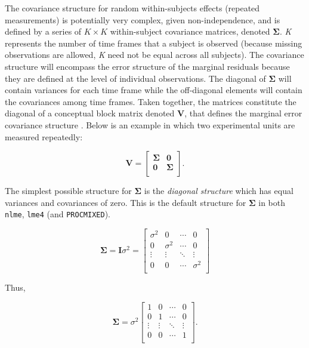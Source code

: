 \documentclass[12pt,english]{article}\usepackage[]{graphicx}\usepackage[table]{xcolor}
\begin{document}
The covariance structure for random within-subjects effects (repeated measurements) is potentially very complex, given non-independence, and is defined by a series of $K \times K$ within-subject covariance matrices, denoted $\boldsymbol{\Sigma}$. \textit{K} represents  the number of time frames that a subject is observed (because missing observations are allowed, \textit{K} need not be equal across all subjects). The covariance structure will encompass the error structure of the marginal residuals because they are defined at the level of individual observations. The diagonal of $\boldsymbol{\Sigma}$ will contain variances for each time frame while the off-diagonal elements will contain the covariances among time frames. Taken together, the matrices constitute the diagonal of a conceptual block matrix denoted $\boldsymbol{V}$, that defines the marginal error covariance structure \citep[cf.][]{litt2007}. Below is an example in which two experimental units are measured repeatedly:

\[\boldsymbol{V} = \left[
 \begin{matrix}
  \boldsymbol{\Sigma} & \boldsymbol{0} \\
  \boldsymbol{0} & \boldsymbol{\Sigma} \\
  \end{matrix}
\right].
 \]

The simplest possible structure for $\boldsymbol{\Sigma}$ is the \textit{diagonal structure} which  has equal variances and covariances of zero. This is the default structure for $\boldsymbol{\Sigma}$ in both \texttt{nlme}, \texttt{lme4} (and \texttt{PROCMIXED}).

\[\boldsymbol{\Sigma} = \boldsymbol{I}\sigma^2 = \left[
 \begin{matrix}
  \sigma^2 & 0 & \cdots & 0 \\
  0 & \sigma^2 & \cdots & 0 \\
  \vdots & \vdots & \ddots & \vdots  \\
  0 & 0 & \cdots & \sigma^2  \\
 \end{matrix}
\right]
 \]

Thus,

\[\boldsymbol{\Sigma} = \sigma^2\left[
 \begin{matrix}
  1 & 0 & \cdots & 0 \\
  0 & 1 & \cdots & 0 \\
  \vdots & \vdots & \ddots & \vdots  \\
  0 & 0 & \cdots & 1  \\
 \end{matrix}
\right].
 \]
\end{document}
